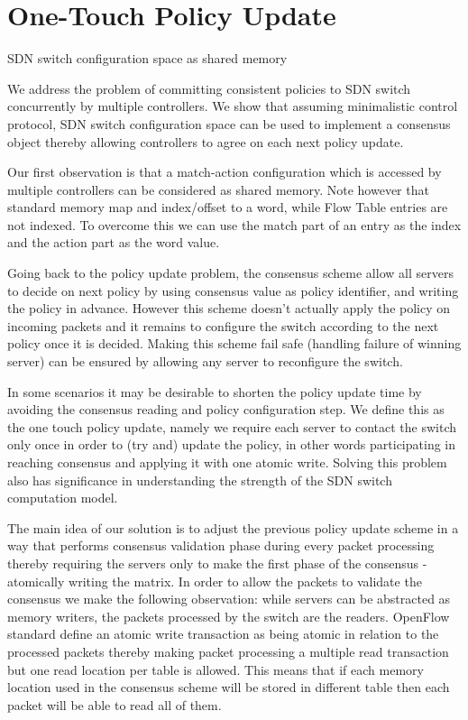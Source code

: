 \documentclass[conference]{sigcomm-alternate}
\begin{document}
\section{One-Touch Policy Update}\label{sec:realization}

SDN switch configuration space as shared memory


We address the problem of committing consistent policies to SDN switch concurrently by multiple controllers.
We show that assuming minimalistic control protocol, SDN switch configuration space can be used to implement a consensus object thereby allowing controllers to agree on each next policy update.

Our first observation is that a match-action configuration which is accessed by multiple controllers can be considered as shared memory. Note however that standard memory map and index/offset to a word, while Flow Table entries are not indexed. To overcome this we can use the match part of an entry as the index and the action part as the word value.


Going back to the policy update problem, the consensus scheme allow all servers to decide on next policy by using consensus value as policy identifier, and writing the policy in advance. However this scheme doesn't actually apply the policy on incoming packets and it remains to configure the switch according to the next policy once it is decided. Making this scheme fail safe (handling failure of winning server) can be ensured by allowing any server to reconfigure the switch.

In some scenarios it may be desirable to shorten the policy update time by avoiding the consensus reading and policy configuration step. We define this as the one touch policy update, namely we require each server to contact the switch only once in order to (try and) update the policy, in other words participating in reaching consensus and applying it with one atomic write. Solving this problem also has significance in understanding the strength of the SDN switch computation model.

The main idea of our solution is to adjust the previous policy update scheme in a way that performs consensus validation phase during every packet processing thereby requiring the servers only to make the first phase of the consensus - atomically writing the matrix.
In order to allow the packets to validate the consensus we make the following observation: while servers can be abstracted as memory writers, the packets processed by the switch are the readers. OpenFlow standard define an atomic write transaction as being atomic in relation to the processed packets thereby making packet processing a multiple read transaction but one read location per table is allowed. This means that if each memory location used in the consensus scheme will be stored in different table then each packet will be able to read all of them.
\end{document}
